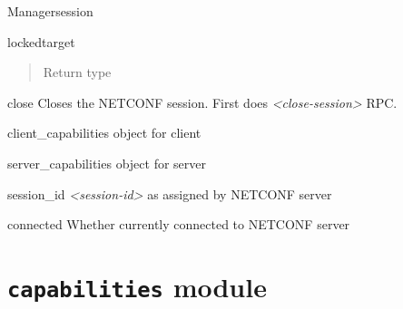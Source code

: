 \documentclass[a4paper,10pt,english]{manual}
\begin{document}
\begin{classdesc}{Manager}{session}
\begin{methoddesc}{locked}{target}
\begin{quote}
\begin{description}
\item[Return type]

\end{description}\end{quote}
\end{methoddesc}

\hypertarget{ncclient.manager.Manager.close}{}\begin{methoddesc}{close}{}
Closes the NETCONF session. First does \emph{\textless{}close-session\textgreater{}} RPC.
\end{methoddesc}

\hypertarget{ncclient.manager.Manager.client_capabilities}{}\begin{memberdesc}{client\_capabilities}
\hyperlink{ncclient.capabilities.Capabilities}{} object for client
\end{memberdesc}

\hypertarget{ncclient.manager.Manager.server_capabilities}{}\begin{memberdesc}{server\_capabilities}
\hyperlink{ncclient.capabilities.Capabilities}{} object for server
\end{memberdesc}

\hypertarget{ncclient.manager.Manager.session_id}{}\begin{memberdesc}{session\_id}
\emph{\textless{}session-id\textgreater{}} as assigned by NETCONF server
\end{memberdesc}

\hypertarget{ncclient.manager.Manager.connected}{}\begin{memberdesc}{connected}
Whether currently connected to NETCONF server
\end{memberdesc}
\end{classdesc}

\resetcurrentobjects
\hypertarget{--doc-userdoc/capabilities}{}

\section{\texttt{capabilities} module}
\hypertarget{module-ncclient.capabilities}{}
\modulesynopsis{}
\end{document}

